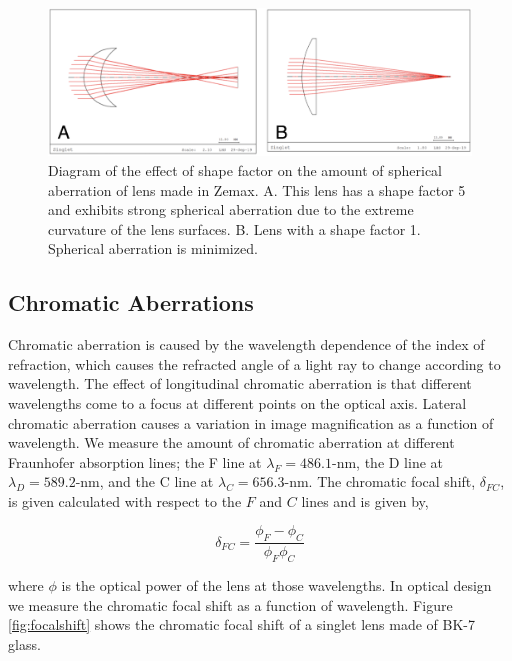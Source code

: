 \begin{figure}
    \centering
    \includegraphics[width=.8\textwidth]{Chapter Materials/Chapter Three Materials/ShapeFactor.png}
    \caption{ Diagram of the effect of shape factor on the amount of spherical aberration of lens made in Zemax. A. This lens has a shape factor 5 and exhibits strong spherical aberration due to the extreme curvature of the lens surfaces. B. Lens with a shape factor 1. Spherical aberration is minimized.}
    \label{fig:shapefactor}
\end{figure}


\subsection{Chromatic Aberrations}

Chromatic aberration is caused by the wavelength dependence of the index of refraction, which causes the refracted angle of a light ray to change according to wavelength. The effect of longitudinal chromatic aberration is that different wavelengths come to a focus at different points on the optical axis. Lateral chromatic aberration causes a variation in image magnification as a function of wavelength. We measure the amount of chromatic aberration at different Fraunhofer absorption lines; the F line at $\lambda_F=486.1$-nm, the D line at $\lambda_D=589.2$-nm, and the C line at $\lambda_C= 656.3$-nm. The chromatic focal shift, $\delta_{FC}$,  is given calculated with respect to the $F$ and $C$ lines and is given by,

\begin{equation}
    \delta_{FC}=\frac{\phi_F-\phi_C}{\phi_F \phi_C}
\end{equation}


\noindent where $\phi$ is the optical power of the lens at those wavelengths. In optical design we measure the chromatic focal shift as a function of wavelength. Figure \ref{fig:focalshift} shows the chromatic focal shift of a singlet lens made of BK-7 glass.

